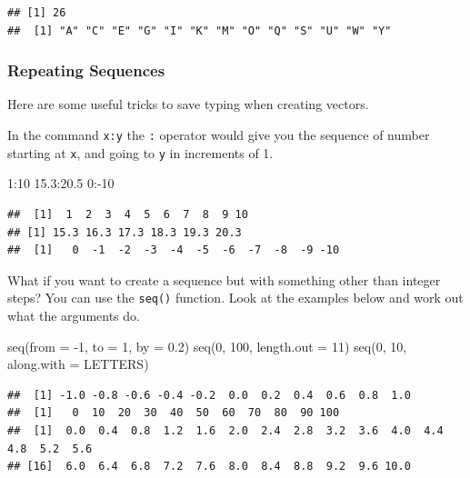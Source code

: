 \documentclass[
  oneside]{book}
\newenvironment{Shaded}{\begin{snugshade}}{\end{snugshade}}
\newcommand{\AttributeTok}[1]{\textcolor[rgb]{0.77,0.63,0.00}{#1}}
\newcommand{\DecValTok}[1]{\textcolor[rgb]{0.00,0.00,0.81}{#1}}
\newcommand{\FloatTok}[1]{\textcolor[rgb]{0.00,0.00,0.81}{#1}}
\newcommand{\FunctionTok}[1]{\textcolor[rgb]{0.00,0.00,0.00}{#1}}
\newcommand{\NormalTok}[1]{#1}
\newcommand{\SpecialCharTok}[1]{\textcolor[rgb]{0.00,0.00,0.00}{#1}}
\begin{document}
\begin{verbatim}
## [1] 26
##  [1] "A" "C" "E" "G" "I" "K" "M" "O" "Q" "S" "U" "W" "Y"
\end{verbatim}

\hypertarget{rep_seq}{%
\subsubsection{Repeating Sequences}\label{rep_seq}}

Here are some useful tricks to save typing when creating vectors.

In the command \texttt{x:y} the \texttt{:} operator would give you the sequence of number starting at \texttt{x}, and going to \texttt{y} in increments of 1.

\begin{Shaded}
\begin{Highlighting}[]
\DecValTok{1}\SpecialCharTok{:}\DecValTok{10}
\FloatTok{15.3}\SpecialCharTok{:}\FloatTok{20.5}
\DecValTok{0}\SpecialCharTok{:{-}}\DecValTok{10}
\end{Highlighting}
\end{Shaded}

\begin{verbatim}
##  [1]  1  2  3  4  5  6  7  8  9 10
## [1] 15.3 16.3 17.3 18.3 19.3 20.3
##  [1]   0  -1  -2  -3  -4  -5  -6  -7  -8  -9 -10
\end{verbatim}

What if you want to create a sequence but with something other than integer steps? You can use the \texttt{seq()} function. Look at the examples below and work out what the arguments do.

\begin{Shaded}
\begin{Highlighting}[]
\FunctionTok{seq}\NormalTok{(}\AttributeTok{from =} \SpecialCharTok{{-}}\DecValTok{1}\NormalTok{, }\AttributeTok{to =} \DecValTok{1}\NormalTok{, }\AttributeTok{by =} \FloatTok{0.2}\NormalTok{)}
\FunctionTok{seq}\NormalTok{(}\DecValTok{0}\NormalTok{, }\DecValTok{100}\NormalTok{, }\AttributeTok{length.out =} \DecValTok{11}\NormalTok{)}
\FunctionTok{seq}\NormalTok{(}\DecValTok{0}\NormalTok{, }\DecValTok{10}\NormalTok{, }\AttributeTok{along.with =}\NormalTok{ LETTERS)}
\end{Highlighting}
\end{Shaded}

\begin{verbatim}
##  [1] -1.0 -0.8 -0.6 -0.4 -0.2  0.0  0.2  0.4  0.6  0.8  1.0
##  [1]   0  10  20  30  40  50  60  70  80  90 100
##  [1]  0.0  0.4  0.8  1.2  1.6  2.0  2.4  2.8  3.2  3.6  4.0  4.4  4.8  5.2  5.6
## [16]  6.0  6.4  6.8  7.2  7.6  8.0  8.4  8.8  9.2  9.6 10.0
\end{verbatim}
\end{document}
